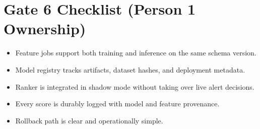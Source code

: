\documentclass{article}
\begin{document}
\section*{Gate 6 Checklist (Person 1 Ownership)}
\begin{itemize}
\item Feature jobs support both training and inference on the same schema version.
\item Model registry tracks artifacts, dataset hashes, and deployment metadata.
\item Ranker is integrated in shadow mode without taking over live alert decisions.
\item Every score is durably logged with model and feature provenance.
\item Rollback path is clear and operationally simple.
\end{itemize}
\end{document}
